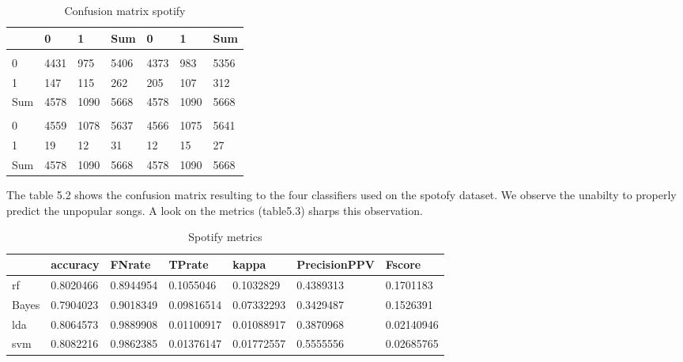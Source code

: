 \documentclass[
]{report}
\begin{document}
\begin{table}

\caption{\label{tab:unnamed-chunk-10}Confusion matrix spotify}
\centering
\begin{tabular}[t]{l|l|l|l|l|l|l}
\hline
  & 0 & 1 & Sum & 0 & 1 & Sum\\
\hline
\cellcolor{lightgrey}{} & \cellcolor{lightgrey}{rf} & \cellcolor{lightgrey}{} & \cellcolor{lightgrey}{} & \cellcolor{lightgrey}{bayes} & \cellcolor{lightgrey}{} & \cellcolor{lightgrey}{}\\
\hline
0 & 4431 & 975 & 5406 & 4373 & 983 & 5356\\
\hline
1 & 147 & 115 & 262 & 205 & 107 & 312\\
\hline
Sum & 4578 & 1090 & 5668 & 4578 & 1090 & \vphantom{1} 5668\\
\hline
\cellcolor{lightgrey}{} & \cellcolor{lightgrey}{lda} & \cellcolor{lightgrey}{} & \cellcolor{lightgrey}{} & \cellcolor{lightgrey}{svm} & \cellcolor{lightgrey}{} & \cellcolor{lightgrey}{}\\
\hline
0 & 4559 & 1078 & 5637 & 4566 & 1075 & 5641\\
\hline
1 & 19 & 12 & 31 & 12 & 15 & 27\\
\hline
Sum & 4578 & 1090 & 5668 & 4578 & 1090 & 5668\\
\hline
\end{tabular}
\end{table}

The table 5.2 shows the confusion matrix resulting to the four classifiers used on the spotofy dataset. We observe the unabilty to properly predict the unpopular songs. A look on the metrics (table5.3) sharps this observation.

\begin{table}

\caption{\label{tab:unnamed-chunk-11}Spotify metrics}
\centering
\begin{tabular}[t]{l|l|l|l|l|l|l}
\hline
  & accuracy & FNrate & TPrate & kappa & PrecisionPPV & Fscore\\
\hline
rf & 0.8020466 & 0.8944954 & 0.1055046 & 0.1032829 & 0.4389313 & 0.1701183\\
\hline
Bayes & 0.7904023 & 0.9018349 & 0.09816514 & 0.07332293 & 0.3429487 & 0.1526391\\
\hline
lda & 0.8064573 & 0.9889908 & 0.01100917 & 0.01088917 & 0.3870968 & 0.02140946\\
\hline
svm & 0.8082216 & 0.9862385 & 0.01376147 & 0.01772557 & 0.5555556 & 0.02685765\\
\hline
\end{tabular}
\end{table}
\end{document}
